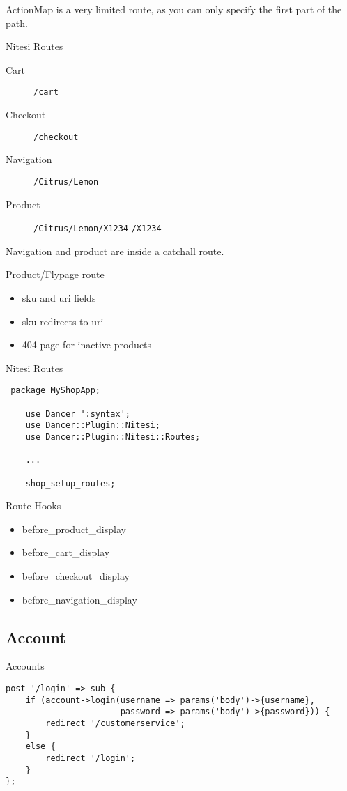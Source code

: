 ActionMap is a very limited route, as you can only
specify the first part of the path.

\begin{frame}[fragile]{Nitesi Routes}
\begin{description}
\item[Cart] \verb|/cart| 
\item[Checkout] \verb|/checkout|
\item[Navigation] \verb|/Citrus/Lemon|
\item[Product] \verb|/Citrus/Lemon/X1234| \verb|/X1234|
\end{description}
\end{frame}

Navigation and product are inside a catchall route.

\begin{frame}{Product/Flypage route}
\begin{itemize}
\item sku and uri fields
\item sku redirects to uri
\item 404 page for inactive products
\end{itemize}
\end{frame}

\begin{frame}[fragile]{Nitesi Routes}
\begin{lstlisting}
 package MyShopApp;

    use Dancer ':syntax';
    use Dancer::Plugin::Nitesi;
    use Dancer::Plugin::Nitesi::Routes;

    ...

    shop_setup_routes;
\end{lstlisting}
\end{frame}

\begin{frame}{Route Hooks}
\begin{itemize}
\item before\_product\_display
\item before\_cart\_display
\item before\_checkout\_display
\item before\_navigation\_display
\end{itemize}
\end{frame}

\subsection{Account}
\begin{frame}[fragile]{Accounts}
\begin{lstlisting}
post '/login' => sub {
    if (account->login(username => params('body')->{username},
                       password => params('body')->{password})) {
        redirect '/customerservice';
    }
    else {
        redirect '/login';
    }
};
\end{lstlisting}
\end{frame}

